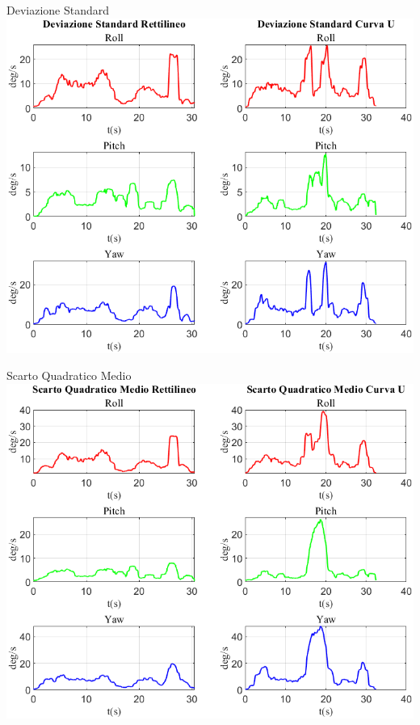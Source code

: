 \documentclass[beamer]{standalone}
\begin{document}
	\begin{frame}{{Deviazione Standard}}
		\centering\includegraphics[height=.8\textheight]{figure/VAng/Deviazione Standard}
	\end{frame}
	
	\begin{frame}{{Scarto Quadratico Medio}}
		\centering\includegraphics[height=.8\textheight]{figure/VAng/Scarto Quadratico Medio}
	\end{frame}
	
\end{document}
